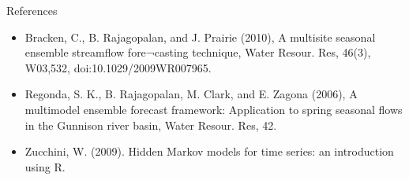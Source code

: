 \documentclass[final,x11names]{beamer}
\begin{document}
\begin{frame}{}
\begin{columns}
\begin{column}{.33\linewidth}
        \begin{block}{References}
        	\small
		\begin{itemize}
	        \item Bracken, C., B. Rajagopalan, and J. Prairie (2010), A multisite seasonal ensemble streamflow fore¬casting technique, Water Resour. Res, 46(3), W03,532, doi:10.1029/2009WR007965. 
	        
	        \item Regonda, S. K., B. Rajagopalan, M. Clark, and E. Zagona (2006), A multimodel ensemble forecast framework: Application to spring seasonal flows in the Gunnison river basin, Water Resour. Res, 
	42. 
	        \item Zucchini, W. (2009). Hidden Markov models for time series: an introduction using R.
        \end{itemize}
        \end{block}
        \vspace{1.1cm}

      
      \end{column}
    \end{columns}
  \end{frame}
\end{document}
